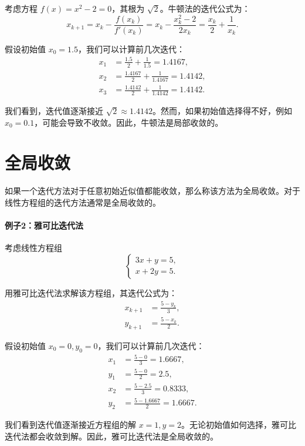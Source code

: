 考虑方程 $f(x) = x^2 - 2 = 0$，其根为 $\sqrt{2}$。牛顿法的迭代公式为：
\[
x_{k+1} = x_k - \frac{f(x_k)}{f'(x_k)} = x_k - \frac{x_k^2 - 2}{2x_k} = \frac{x_k}{2} + \frac{1}{x_k}.
\]

假设初始值 $x_0 = 1.5$，我们可以计算前几次迭代：
\[
\begin{aligned}
x_1 &= \frac{1.5}{2} + \frac{1}{1.5} = 1.4167, \\
x_2 &= \frac{1.4167}{2} + \frac{1}{1.4167} = 1.4142, \\
x_3 &= \frac{1.4142}{2} + \frac{1}{1.4142} = 1.4142.
\end{aligned}
\]

我们看到，迭代值逐渐接近 $\sqrt{2} \approx 1.4142$。然而，如果初始值选择得不好，例如 $x_0 = 0.1$，可能会导致不收敛。因此，牛顿法是局部收敛的。

\section*{全局收敛}

如果一个迭代方法对于任意初始近似值都能收敛，那么称该方法为全局收敛。对于线性方程组的迭代方法通常是全局收敛的。

\paragraph{例子2：雅可比迭代法}
考虑线性方程组
\[
\begin{cases}
3x + y = 5, \\
x + 2y = 5.
\end{cases}
\]

用雅可比迭代法求解该方程组，其迭代公式为：
\[
\begin{aligned}
x_{k+1} &= \frac{5 - y_k}{3}, \\
y_{k+1} &= \frac{5 - x_k}{2}.
\end{aligned}
\]

假设初始值 $x_0 = 0, y_0 = 0$，我们可以计算前几次迭代：
\[
\begin{aligned}
x_1 &= \frac{5 - 0}{3} = 1.6667, \\
y_1 &= \frac{5 - 0}{2} = 2.5, \\
x_2 &= \frac{5 - 2.5}{3} = 0.8333, \\
y_2 &= \frac{5 - 1.6667}{2} = 1.6667.
\end{aligned}
\]

我们看到迭代值逐渐接近方程组的解 $x = 1, y = 2$。无论初始值如何选择，雅可比迭代法都会收敛到解。因此，雅可比迭代法是全局收敛的。





